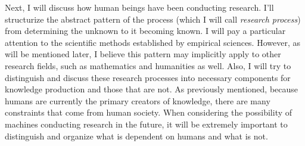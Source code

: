 \documentclass{book}
\begin{document}





Next, I will discuss how human beings have been conducting research. I'll structurize the abstract pattern of the process (which I will call\textit{ research process}) from determining the unknown to it becoming known. I will pay a particular attention to the scientific methods established by empirical sciences. However, as will be mentioned later, I believe this pattern may implicitly apply to other research fields, such as mathematics and humanities as well. Also, I will try to distinguish and discuss these research processes into necessary components for knowledge production and those that are not. As previously mentioned, because humans are currently the primary creators of knowledge, there are many constraints that come from human society. When considering the possibility of machines conducting research in the future, it will be extremely important to distinguish and organize what is dependent on humans and what is not.
\end{document}
